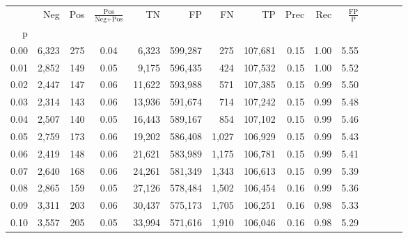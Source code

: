 \begin{tabular}{rrrcrrrrrrrrrrr}
\toprule
{} &     Neg &    Pos & $\frac{\text{Pos}}{\text{Neg}+\text{Pos}}$ &       TN &       FP &       FN &       TP &  Prec &   Rec & $\frac{\text{FP}}{\text{P}}$ \\
p    &         &        &                                            &          &          &          &          &       &       &                              \\
\midrule
0.00 &   6,323 &    275 &                                       0.04 &    6,323 &  599,287 &      275 &  107,681 &  0.15 &  1.00 &                         5.55 \\
0.01 &   2,852 &    149 &                                       0.05 &    9,175 &  596,435 &      424 &  107,532 &  0.15 &  1.00 &                         5.52 \\
0.02 &   2,447 &    147 &                                       0.06 &   11,622 &  593,988 &      571 &  107,385 &  0.15 &  0.99 &                         5.50 \\
0.03 &   2,314 &    143 &                                       0.06 &   13,936 &  591,674 &      714 &  107,242 &  0.15 &  0.99 &                         5.48 \\
0.04 &   2,507 &    140 &                                       0.05 &   16,443 &  589,167 &      854 &  107,102 &  0.15 &  0.99 &                         5.46 \\
0.05 &   2,759 &    173 &                                       0.06 &   19,202 &  586,408 &    1,027 &  106,929 &  0.15 &  0.99 &                         5.43 \\
0.06 &   2,419 &    148 &                                       0.06 &   21,621 &  583,989 &    1,175 &  106,781 &  0.15 &  0.99 &                         5.41 \\
0.07 &   2,640 &    168 &                                       0.06 &   24,261 &  581,349 &    1,343 &  106,613 &  0.15 &  0.99 &                         5.39 \\
0.08 &   2,865 &    159 &                                       0.05 &   27,126 &  578,484 &    1,502 &  106,454 &  0.16 &  0.99 &                         5.36 \\
0.09 &   3,311 &    203 &                                       0.06 &   30,437 &  575,173 &    1,705 &  106,251 &  0.16 &  0.98 &                         5.33 \\
0.10 &   3,557 &    205 &                                       0.05 &   33,994 &  571,616 &    1,910 &  106,046 &  0.16 &  0.98 &                         5.29 \\

\end{tabular}
